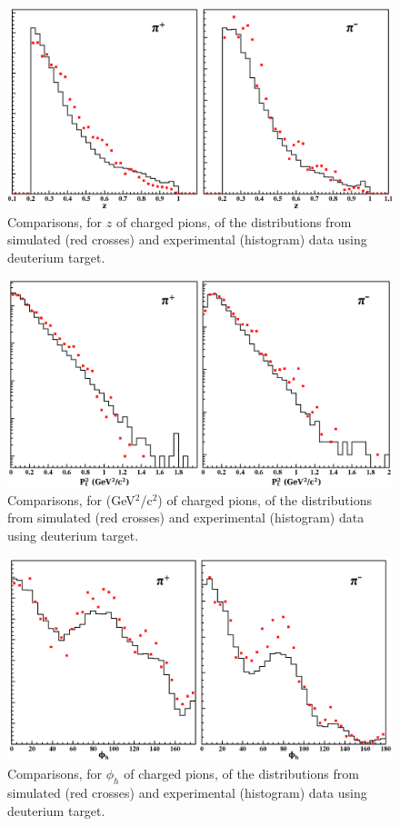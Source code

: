 \begin{figure}[tbp]
\centering
\includegraphics[width=12cm] {chap5-fig/z_compar.png}
\caption {Comparisons, for $z$ of charged pions, of the distributions
from simulated (red crosses) and experimental (histogram) data using deuterium target.}
\label{fig:compZ}
\end{figure}

\begin{figure}[tbp]
\centering
\includegraphics[width=12cm] {chap5-fig/pts_compar.png}
\caption {Comparisons, for \pt (GeV$^2$/c$^2$) of charged pions, of the distributions
from simulated (red crosses) and experimental (histogram) data using deuterium target.}
\label{fig:compPts}
\end{figure}

\begin{figure}[tbp]
\centering
\includegraphics[width=12cm] {chap5-fig/phih_compar.png}
\caption {Comparisons, for $\phi_h$ of charged pions, of the distributions
from simulated (red crosses) and experimental (histogram) data using deuterium target.}
\label{fig:compPhih}
\end{figure}


